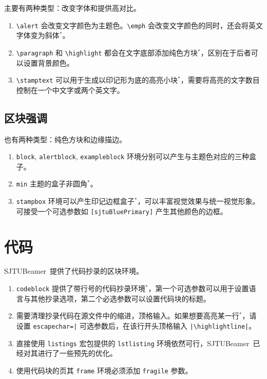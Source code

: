 \documentclass[
    UTF8,
    heading=true,
    12pt,
    a4paper
]{ctexrep}
\newenvironment{commentlist}{\begin{enumerate}\small}{\end{enumerate}}
\def\themename{\textsf{SJTUBeamer}}
\begin{document}
主要有两种类型：改变字体和提供高对比。


\begin{commentlist}
  \item \texttt{\textbackslash{}alert} 会改变文字颜色为主题色。\texttt{\textbackslash{}emph} 会改变文字颜色的同时，还会将英文字体变为斜体$^*$。
  \item \texttt{\textbackslash{}paragraph} 和 \texttt{\textbackslash{}highlight} 都会在文字底部添加纯色方块$^*$，区别在于后者可以设置背景颜色。
  \item \texttt{\textbackslash{}stamptext} 可以用于生成以印记形为底的高亮小块$^*$，需要将高亮的文字数目控制在一个中文字或两个英文字。
\end{commentlist}

\section{区块强调}

也有两种类型：纯色方块和边缘描边。



\begin{commentlist}
  \item \texttt{block}, \texttt{alertblock}, \texttt{exampleblock} 环境分别可以产生与主题色对应的三种盒子。
  \item \texttt{min} 主题的盒子非圆角$^*$。
  \item \texttt{stampbox} 环境可以产生印记边框盒子$^*$，可以丰富视觉效果与统一视觉形象。可接受一个可选参数如 \texttt{[sjtuBluePrimary]} 产生其他颜色的边框。
\end{commentlist}

\chapter{代码}

\themename\ 提供了代码抄录的区块环境。


\begin{commentlist}
  \item \texttt{codeblock} 提供了带行号的代码抄录环境$^*$，第一个可选参数可以用于设置语言与其他抄录选项，第二个必选参数可以设置代码块的标题。
  \item 需要清理抄录代码在源文件中的缩进，顶格输入。如果想要高亮某一行$^*$，请设置 \verb"escapechar=|" 可选参数后，在该行开头顶格输入 \verb"|\highlightline|"。
  \item 直接使用 \texttt{listings} 宏包提供的 \texttt{lstlisting} 环境依然可行，\themename\ 已经对其进行了一些预先的优化。
  \item[\faExclamationTriangle] 使用代码块的页其 \texttt{frame} 环境必须添加 \texttt{fragile} 参数。
\end{commentlist}
\end{document}
